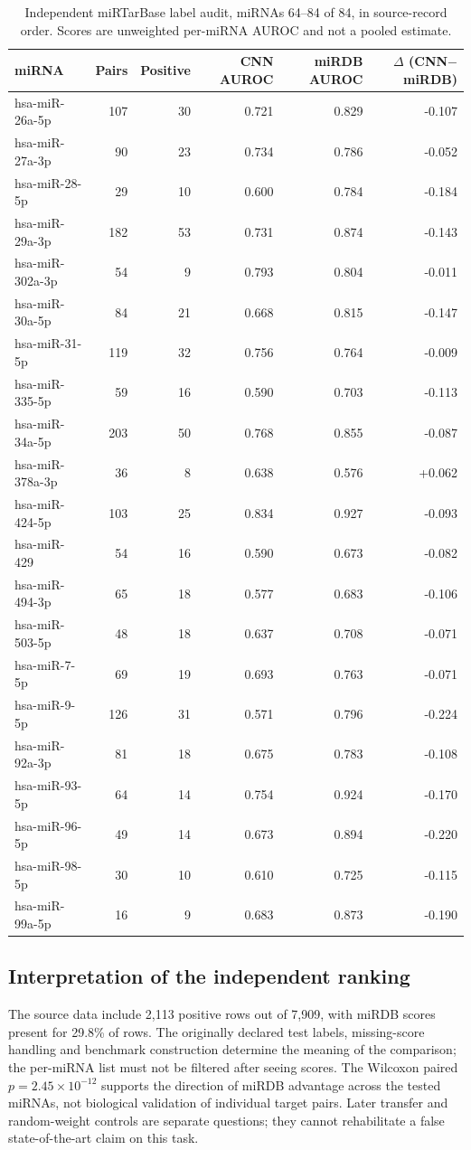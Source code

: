 \begin{table}[htbp]\centering\scriptsize
\begin{tabular}{lrrrrr}\hline
miRNA & Pairs & Positive & CNN AUROC & miRDB AUROC & $\Delta$ (CNN$-$miRDB) \\ \hline
hsa-miR-26a-5p & 107 & 30 & 0.721 & 0.829 & -0.107 \\
hsa-miR-27a-3p & 90 & 23 & 0.734 & 0.786 & -0.052 \\
hsa-miR-28-5p & 29 & 10 & 0.600 & 0.784 & -0.184 \\
hsa-miR-29a-3p & 182 & 53 & 0.731 & 0.874 & -0.143 \\
hsa-miR-302a-3p & 54 & 9 & 0.793 & 0.804 & -0.011 \\
hsa-miR-30a-5p & 84 & 21 & 0.668 & 0.815 & -0.147 \\
hsa-miR-31-5p & 119 & 32 & 0.756 & 0.764 & -0.009 \\
hsa-miR-335-5p & 59 & 16 & 0.590 & 0.703 & -0.113 \\
hsa-miR-34a-5p & 203 & 50 & 0.768 & 0.855 & -0.087 \\
hsa-miR-378a-3p & 36 & 8 & 0.638 & 0.576 & +0.062 \\
hsa-miR-424-5p & 103 & 25 & 0.834 & 0.927 & -0.093 \\
hsa-miR-429 & 54 & 16 & 0.590 & 0.673 & -0.082 \\
hsa-miR-494-3p & 65 & 18 & 0.577 & 0.683 & -0.106 \\
hsa-miR-503-5p & 48 & 18 & 0.637 & 0.708 & -0.071 \\
hsa-miR-7-5p & 69 & 19 & 0.693 & 0.763 & -0.071 \\
hsa-miR-9-5p & 126 & 31 & 0.571 & 0.796 & -0.224 \\
hsa-miR-92a-3p & 81 & 18 & 0.675 & 0.783 & -0.108 \\
hsa-miR-93-5p & 64 & 14 & 0.754 & 0.924 & -0.170 \\
hsa-miR-96-5p & 49 & 14 & 0.673 & 0.894 & -0.220 \\
hsa-miR-98-5p & 30 & 10 & 0.610 & 0.725 & -0.115 \\
hsa-miR-99a-5p & 16 & 9 & 0.683 & 0.873 & -0.190 \\
\hline\end{tabular}
\caption{Independent miRTarBase label audit, miRNAs 64--84 of 84, in source-record order. Scores are unweighted per-miRNA AUROC and not a pooled estimate.}\label{tab:mirna-audit-4}
\end{table}
\subsection{Interpretation of the independent ranking}
The source data include 2,113 positive rows out of 7,909, with miRDB scores present for 29.8\% of rows. The originally declared test labels, missing-score handling and benchmark construction determine the meaning of the comparison; the per-miRNA list must not be filtered after seeing scores. The Wilcoxon paired $p=2.45\times 10^{-12}$ supports the direction of miRDB advantage across the tested miRNAs, not biological validation of individual target pairs. Later transfer and random-weight controls are separate questions; they cannot rehabilitate a false state-of-the-art claim on this task.
